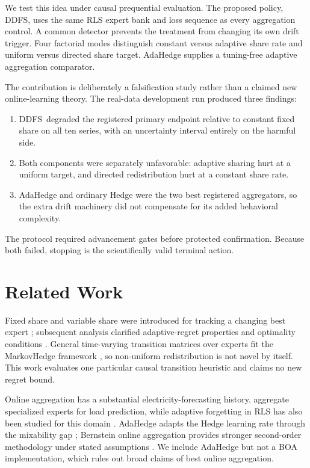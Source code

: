 \documentclass[10pt]{article}
\newcommand{\ddfs}{\textsc{DDFS}}
\begin{document}
We test this idea under causal prequential evaluation. The proposed policy, \ddfs,
uses the same RLS expert bank and loss sequence as every aggregation control.
A common detector prevents the treatment from changing its own drift trigger. Four
factorial modes distinguish constant versus adaptive share rate and uniform versus
directed share target. AdaHedge \citep{derooij2014follow} supplies a tuning-free
adaptive aggregation comparator.

The contribution is deliberately a falsification study rather than a claimed new
online-learning theory. The real-data development run produced three findings:
\begin{enumerate}[leftmargin=*]
  \item \ddfs\ degraded the registered primary endpoint relative to constant fixed
  share on all ten series, with an uncertainty interval entirely on the harmful side.
  \item Both components were separately unfavorable: adaptive sharing hurt at a
  uniform target, and directed redistribution hurt at a constant share rate.
  \item AdaHedge and ordinary Hedge were the two best registered aggregators, so the
  extra drift machinery did not compensate for its added behavioral complexity.
\end{enumerate}
The protocol required advancement gates before protected confirmation. Because both
failed, stopping is the scientifically valid terminal action.

\section{Related Work}

Fixed share and variable share were introduced for tracking a changing best expert
\citep{herbster1998tracking}; subsequent analysis clarified adaptive-regret
properties and optimality conditions \citep{adamskiy2016closer}. General
time-varying transition matrices over experts fit the MarkovHedge framework
\citep{mourtada2017efficient}, so non-uniform redistribution is not novel by itself.
This work evaluates one particular causal transition heuristic and claims no new
regret bound.

Online aggregation has a substantial electricity-forecasting history.
\citet{devaine2013forecasting} aggregate specialized experts for load prediction,
while adaptive forgetting in RLS has also been studied for this domain
\citep{ba2012adaptive}. AdaHedge adapts the Hedge learning rate through the
mixability gap \citep{derooij2014follow}; Bernstein online aggregation provides
stronger second-order methodology under stated assumptions
\citep{wintenberger2017optimal}. We include AdaHedge but not a BOA implementation,
which rules out broad claims of best online aggregation.
\end{document}
